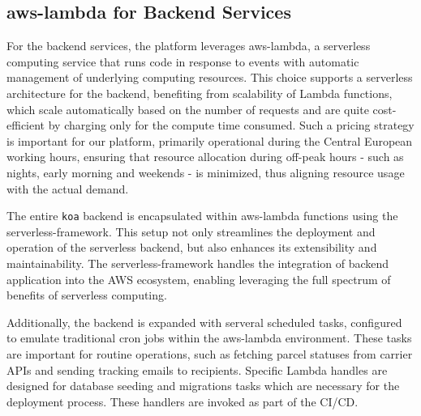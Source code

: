 \subsection{\gls{aws-lambda} for Backend Services}
\label{subsec:aws-lambda-backend}
For the backend services, the platform leverages \gls{aws-lambda}, a serverless computing service that runs code in response to events with automatic management of underlying computing resources.
This choice supports a serverless architecture for the backend, benefiting from scalability of Lambda functions, which scale automatically based on the number of requests and are quite cost-efficient by charging only for the compute time consumed.
Such a pricing strategy is important for our platform, primarily operational during the Central European working hours, ensuring that resource allocation during off-peak hours - such as nights, early morning and weekends - is minimized, thus aligning resource usage with the actual demand.

The entire \texttt{\gls{koa}} backend is encapsulated within \gls{aws-lambda} functions using the \gls{serverless-framework}.
This setup not only streamlines the deployment and operation of the serverless backend, but also enhances its extensibility and maintainability.
The \gls{serverless-framework} handles the integration of backend application into the \ac{AWS} ecosystem, enabling leveraging the full spectrum of benefits of serverless computing.

Additionally, the backend is expanded with serveral scheduled tasks, configured to emulate traditional cron jobs within the \gls{aws-lambda} environment.
These tasks are important for routine operations, such as fetching parcel statuses from carrier APIs and sending tracking emails to recipients.
Specific Lambda handles are designed for database seeding and migrations tasks which are necessary for the deployment process.
These handlers are invoked as part of the \ac{CI}/\ac{CD}.

